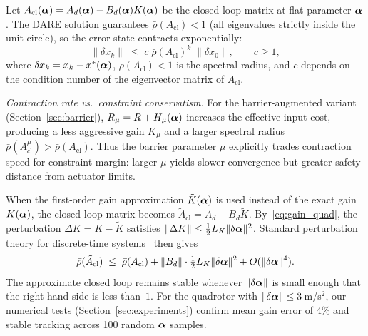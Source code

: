 \begin{proposition}\label{prop:contraction}
Let $A_{\mathrm{cl}}(\bm{\alpha}) = A_d(\bm{\alpha}) - B_d(\bm{\alpha}) K(\bm{\alpha})$
be the closed-loop matrix at flat parameter $\bm{\alpha}$.
The DARE solution guarantees
$\bar\rho(A_{\mathrm{cl}}) < 1$
(all eigenvalues strictly inside the unit circle),
so the error state contracts exponentially:
\begin{equation}\label{eq:contraction}
  \|\delta x_k\| \;\leq\; c \; \bar\rho(A_{\mathrm{cl}})^k \; \|\delta x_0\|,
  \qquad c \geq 1,
\end{equation}
where $\delta x_k = x_k - x^*(\bm{\alpha})$,
$\bar\rho(A_{\mathrm{cl}}) < 1$ is the spectral radius,
and $c$ depends on the condition number of the eigenvector
matrix of $A_{\mathrm{cl}}$.
\end{proposition}

\textit{Contraction rate vs.\ constraint conservatism.}
For the barrier-augmented variant (Section~\ref{sec:barrier}),
$R_\mu = R + H_\mu(\bm{\alpha})$ increases the effective input
cost, producing a less aggressive gain $K_\mu$ and a larger
spectral radius $\bar\rho(A_{\mathrm{cl}}^\mu) > \bar\rho(A_{\mathrm{cl}})$.
Thus the barrier parameter $\mu$ explicitly trades contraction
speed for constraint margin: larger $\mu$ yields slower
convergence but greater safety distance from actuator limits.

\begin{corollary}\label{cor:tracking}
When the first-order gain approximation $\tilde{K}(\bm{\alpha})$
is used instead of the exact gain $K(\bm{\alpha})$,
the closed-loop matrix becomes
$\tilde{A}_{\mathrm{cl}} = A_d - B_d \tilde{K}$.
By~\eqref{eq:gain_quad}, the perturbation
$\Delta K = K - \tilde{K}$ satisfies
$\|\Delta K\| \leq \frac{1}{2} L_K \|\delta\bm{\alpha}\|^2$.
Standard perturbation theory for discrete-time
systems~\cite{konstantinov1993} then gives
\begin{equation}\label{eq:tracking_bound}
  \bar\rho(\tilde{A}_{\mathrm{cl}})
  \;\leq\; \bar\rho(A_{\mathrm{cl}})
  + \|B_d\| \cdot \tfrac{1}{2} L_K \|\delta\bm{\alpha}\|^2
  + O(\|\delta\bm{\alpha}\|^4).
\end{equation}
The approximate closed loop remains stable whenever
$\|\delta\bm{\alpha}\|$ is small enough that the right-hand
side is less than~$1$.
For the quadrotor with $\|\delta\bm{\alpha}\| \leq 3$\,m/s$^2$,
our numerical tests (Section~\ref{sec:experiments})
confirm mean gain error of $4\%$ and stable tracking
across 100 random $\bm{\alpha}$ samples.
\end{corollary}
